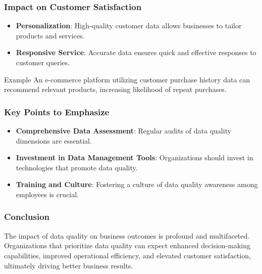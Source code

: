 \documentclass{beamer}
\begin{document}
\begin{frame}[fragile]
    \frametitle{Impact on Customer Satisfaction}
    \begin{itemize}
        \item \textbf{Personalization}: High-quality customer data allows businesses to tailor products and services.
        \item \textbf{Responsive Service}: Accurate data ensures quick and effective responses to customer queries.
    \end{itemize}
    \begin{block}{Example}
        An e-commerce platform utilizing customer purchase history data can recommend relevant products, increasing likelihood of repeat purchases.
    \end{block}
\end{frame}

\begin{frame}[fragile]
    \frametitle{Key Points to Emphasize}
    \begin{itemize}
        \item \textbf{Comprehensive Data Assessment}: Regular audits of data quality dimensions are essential.
        \item \textbf{Investment in Data Management Tools}: Organizations should invest in technologies that promote data quality.
        \item \textbf{Training and Culture}: Fostering a culture of data quality awareness among employees is crucial.
    \end{itemize}
\end{frame}

\begin{frame}[fragile]
    \frametitle{Conclusion}
    The impact of data quality on business outcomes is profound and multifaceted. Organizations that prioritize data quality can expect enhanced decision-making capabilities, improved operational efficiency, and elevated customer satisfaction, ultimately driving better business results.
\end{frame}
\end{document}
